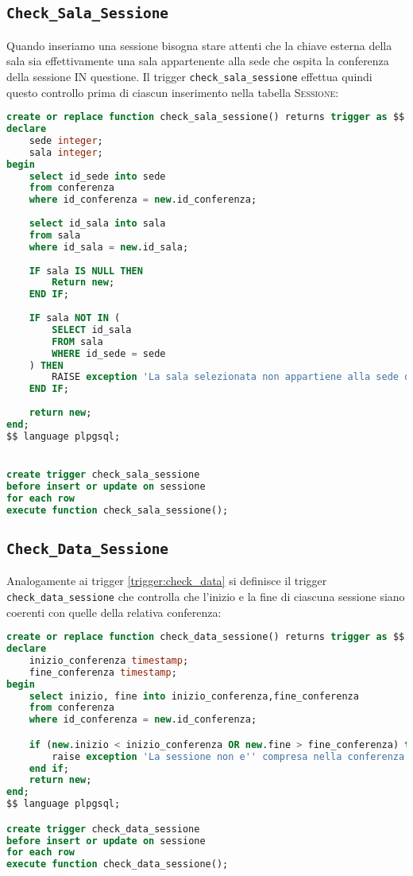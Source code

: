 \subsection{\texttt{Check\_Sala\_Sessione}}
Quando inseriamo una sessione bisogna stare attenti che la chiave esterna della sala sia effettivamente una sala appartenente alla sede che ospita la conferenza della sessione IN questione. Il trigger \texttt{check\_sala\_sessione} effettua quindi questo controllo prima di ciascun inserimento nella tabella \textsc{Sessione}:
\begin{lstlisting}[language=SQL, style=mystyle]
create or replace function check_sala_sessione() returns trigger as $$
declare
    sede integer;
    sala integer;
begin
    select id_sede into sede
    from conferenza
    where id_conferenza = new.id_conferenza;
    
    select id_sala into sala
    from sala
    where id_sala = new.id_sala;
    
    IF sala IS NULL THEN
        Return new;
    END IF;
    
    IF sala NOT IN (
        SELECT id_sala
        FROM sala
        WHERE id_sede = sede
    ) THEN
        RAISE exception 'La sala selezionata non appartiene alla sede della conferenza';
    END IF;
    
    return new;
end;
$$ language plpgsql;


create trigger check_sala_sessione
before insert or update on sessione
for each row
execute function check_sala_sessione();
\end{lstlisting}
\subsection{\texttt{Check\_Data\_Sessione}}
Analogamente ai trigger \ref{trigger:check_data} si definisce il trigger \texttt{check\_data\_sessione} che controlla che l'inizio e la fine di ciascuna sessione siano coerenti con quelle della relativa conferenza:
\begin{lstlisting}[language=SQL, style=mystyle, caption={\texttt{check\_data\_sessione}}]
create or replace function check_data_sessione() returns trigger as $$
declare
    inizio_conferenza timestamp;
    fine_conferenza timestamp;
begin
    select inizio, fine into inizio_conferenza,fine_conferenza
    from conferenza
    where id_conferenza = new.id_conferenza;

    if (new.inizio < inizio_conferenza OR new.fine > fine_conferenza) then
        raise exception 'La sessione non e'' compresa nella conferenza';
    end if;
    return new;
end;
$$ language plpgsql;

create trigger check_data_sessione
before insert or update on sessione
for each row
execute function check_data_sessione();
\end{lstlisting}
